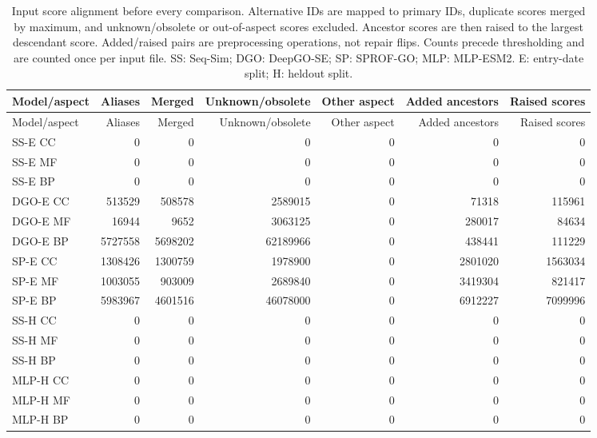 \begingroup\scriptsize
\setlength{\tabcolsep}{4pt}
\begin{longtable}{lrrrrrr}
\caption{Input score alignment before every comparison. Alternative IDs are mapped to primary IDs, duplicate scores merged by maximum, and unknown/obsolete or out-of-aspect scores excluded. Ancestor scores are then raised to the largest descendant score. Added/raised pairs are preprocessing operations, not repair flips. Counts precede thresholding and are counted once per input file. SS: Seq-Sim; DGO: DeepGO-SE; SP: SPROF-GO; MLP: MLP-ESM2. E: entry-date split; H: heldout split.}\label{tab:supp-identifiers}\\
\toprule
Model/aspect & Aliases & Merged & Unknown/obsolete & Other aspect & Added ancestors & Raised scores \\
\midrule
\endfirsthead
\toprule
Model/aspect & Aliases & Merged & Unknown/obsolete & Other aspect & Added ancestors & Raised scores \\
\midrule
\endhead
SS-E CC & 0 & 0 & 0 & 0 & 0 & 0 \\
SS-E MF & 0 & 0 & 0 & 0 & 0 & 0 \\
SS-E BP & 0 & 0 & 0 & 0 & 0 & 0 \\
DGO-E CC & 513529 & 508578 & 2589015 & 0 & 71318 & 115961 \\
DGO-E MF & 16944 & 9652 & 3063125 & 0 & 280017 & 84634 \\
DGO-E BP & 5727558 & 5698202 & 62189966 & 0 & 438441 & 111229 \\
SP-E CC & 1308426 & 1300759 & 1978900 & 0 & 2801020 & 1563034 \\
SP-E MF & 1003055 & 903009 & 2689840 & 0 & 3419304 & 821417 \\
SP-E BP & 5983967 & 4601516 & 46078000 & 0 & 6912227 & 7099996 \\
SS-H CC & 0 & 0 & 0 & 0 & 0 & 0 \\
SS-H MF & 0 & 0 & 0 & 0 & 0 & 0 \\
SS-H BP & 0 & 0 & 0 & 0 & 0 & 0 \\
MLP-H CC & 0 & 0 & 0 & 0 & 0 & 0 \\
MLP-H MF & 0 & 0 & 0 & 0 & 0 & 0 \\
MLP-H BP & 0 & 0 & 0 & 0 & 0 & 0 \\
\bottomrule
\end{longtable}
\endgroup
